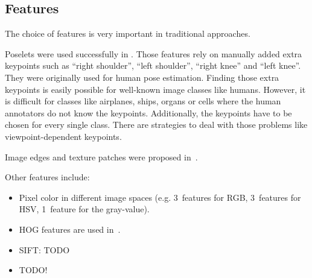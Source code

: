 
\subsection{Features}\label{subsec:features}%
The choice of features is very important in traditional approaches.

Poselets were used successfully in \cite{bourdev2010detecting,brox2011object}.
Those features rely on manually added extra keypoints such as \enquote{right
shoulder}, \enquote{left shoulder}, \enquote{right knee} and \enquote{left
knee}. They were originally used for human pose estimation. Finding those extra
keypoints is easily possible for well-known image classes like humans. However,
it is difficult for classes like airplanes, ships, organs or cells where the
human annotators do not know the keypoints. Additionally, the keypoints have to
be chosen for every single class. There are strategies to deal with those
problems like viewpoint-dependent keypoints.

Image edges and texture patches were proposed in~\cite{brox2011object}.

Other features include:

\begin{itemize}
    \item Pixel color in different image spaces (e.g. 3~features for RGB,
          3~features for HSV, 1~feature for the gray-value).
    \item \Gls{HOG} features are used in~\cite{bourdev2010detecting,felzenszwalb2010object}.
    \item SIFT: TODO
    \item TODO!
\end{itemize}
